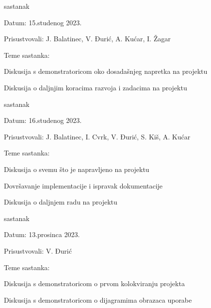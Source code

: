 \begin{packed_enum}
			\item  sastanak
			
			\item[] \begin{packed_item}
				\item Datum: 15.studenog 2023.
				\item Prisustvovali: J. Balatinec, V. Đurić, A. Kućar, I. Žagar
				\item Teme sastanka:
				\begin{packed_item}
					\item  Diskusija s demonstratoricom oko dosadašnjeg napretka na projektu
					\item  Diskusija o daljnjim koracima razvoja i zadacima na projektu
				\end{packed_item}
			\end{packed_item}
			
			\item  sastanak
			
			\item[] \begin{packed_item}
				\item Datum: 16.studenog 2023.
				\item Prisustvovali: J. Balatinec, I. Cvrk, V. Đurić, S. Kiš, A. Kućar
				\item Teme sastanka:
				\begin{packed_item}
					\item  Diskusija o svemu što je napravljeno na projektu
					\item  Dovršavanje implementacije i ispravak dokumentacije
					\item  Diskusija o daljnjem radu na projektu
				\end{packed_item}
			\end{packed_item}
			
			\item  sastanak
			
			\item[] \begin{packed_item}
				\item Datum: 13.prosinca 2023.
				\item Prisustvovali: V. Đurić
				\item Teme sastanka:
				\begin{packed_item}
					\item  Diskusija s demonstratoricom o prvom kolokviranju projekta
					\item  Diskusija s demonstratoricom o dijagramima obrazaca uporabe
				\end{packed_item}
			\end{packed_item}
			
			
		\end{packed_enum}
		
